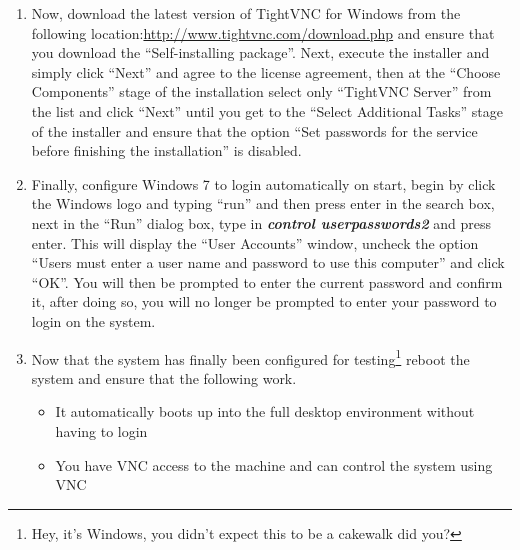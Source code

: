 \begin{enumerate}
\item	Now, download the latest version of TightVNC for Windows from the following location:\url{http://www.tightvnc.com/download.php}
		and ensure that you download the ``Self-installing package''. Next, execute the installer and simply click ``Next'' and agree
		to the license agreement, then at the ``Choose Components'' stage of the installation select only ``TightVNC Server'' from
		the list and click ``Next'' until you get to the ``Select Additional Tasks'' stage of the installer and ensure that the
		option ``Set passwords for the service before finishing the installation'' is disabled.
		
\item	Finally, configure Windows 7 to login automatically on start, begin by click the Windows logo and typing ``run'' and then press
		enter in the search box, next in the ``Run'' dialog box, type in \emph{\bf control userpasswords2} and press enter. This will
		display the ``User Accounts'' window, uncheck the option ``Users must enter a user name and password to use this computer''
		and click ``OK''. You will then be prompted to enter the current password and confirm it, after doing so, you will no longer 
		be prompted to enter your password to login on the system.

\item	Now that the system has finally been configured for testing\footnote{Hey, it's Windows, you didn't expect this to be a cakewalk
		did you?} reboot the system and ensure that the following work.
\begin{itemize}
\item	It automatically boots up into the full desktop environment without having to login
\item	You have VNC access to the machine and can control the system using VNC	
\end{itemize}
\end{enumerate}


%
